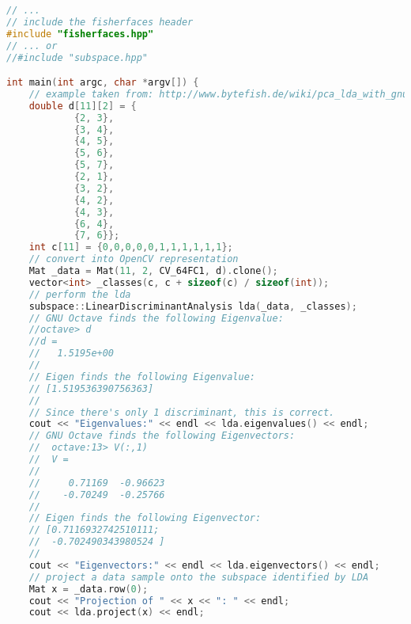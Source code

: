 \begin{lstlisting}[language=c++]
// ...
// include the fisherfaces header
#include "fisherfaces.hpp"
// ... or 
//#include "subspace.hpp"

int main(int argc, char *argv[]) {
	// example taken from: http://www.bytefish.de/wiki/pca_lda_with_gnu_octave
	double d[11][2] = {
			{2, 3},
			{3, 4},
			{4, 5},
			{5, 6},
			{5, 7},
			{2, 1},
			{3, 2},
			{4, 2},
			{4, 3},
			{6, 4},
			{7, 6}};
	int c[11] = {0,0,0,0,0,1,1,1,1,1,1};
	// convert into OpenCV representation
	Mat _data = Mat(11, 2, CV_64FC1, d).clone();
	vector<int> _classes(c, c + sizeof(c) / sizeof(int));
	// perform the lda
	subspace::LinearDiscriminantAnalysis lda(_data, _classes);
	// GNU Octave finds the following Eigenvalue:
	//octave> d
	//d =
	//	 1.5195e+00
	//
	// Eigen finds the following Eigenvalue:
	// [1.519536390756363]
	//
	// Since there's only 1 discriminant, this is correct.
	cout << "Eigenvalues:" << endl << lda.eigenvalues() << endl;
	// GNU Octave finds the following Eigenvectors:
	//	octave:13> V(:,1)
	//	V =
	//
	//	   0.71169  -0.96623
	//	  -0.70249  -0.25766
	//
	// Eigen finds the following Eigenvector:
	// [0.7116932742510111;
	//  -0.702490343980524 ]
	//
	cout << "Eigenvectors:" << endl << lda.eigenvectors() << endl;
	// project a data sample onto the subspace identified by LDA
	Mat x = _data.row(0);
	cout << "Projection of " << x << ": " << endl;
	cout << lda.project(x) << endl;
\end{lstlisting}




